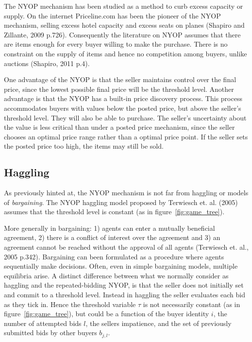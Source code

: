 \documentclass[a4paper,12pt]{article}
\begin{document}
	The NYOP mechanism has been studied as a method to curb excess capacity or supply. On the internet Priceline.com has been the pioneer of the NYOP mechanism, selling excess hotel capacity and excess seats on planes (Shapiro and Zillante, 2009 p.726). Consequently the literature on NYOP assumes that there are items enough for every buyer willing to make the purchase. There is no constraint on the supply of items and hence no competition among buyers, unlike auctions (Shapiro, 2011 p.4).

	One advantage of the NYOP is that the seller maintains control over the final price, since the lowest possible final price will be the threshold level. Another advantage is that the NYOP has a built-in price discovery process. This process accommodates buyers with values below the posted price, but above the seller's threshold level. They will also be able to purchase. The seller's uncertainty about the value is less critical than under a posted price mechanism, since the seller chooses an optimal price range rather than a optimal price point. If the seller sets the posted price too high, the items may still be sold.

	\subsection{Haggling}

	As previously hinted at, the NYOP mechanism is not far from haggling or models of {\it bargaining}. The NYOP haggling model proposed by Terwiesch et. al. (2005) assumes that the threshold level is constant (as in figure~\ref{fig:game_tree}). %

	More generally in bargaining: 1) agents can enter a mutually beneficial agreement, 2) there is a conflict of interest over the agreement and 3) an agreement cannot be reached without the approval of all agents (Terwiesch et. al., 2005 p.342). Bargaining can been formulated as a procedure where agents sequentially make decisions. Often, even in simple bargaining models, multiple equilibria arise. A distinct difference between what we normally consider as haggling and the repeated-bidding NYOP, is that the seller does not initially set and commit to a threshold level. Instead in haggling the seller evaluates each bid as they tick in. Hence the threshold variable $\tau$ is not necessarily constant (as in figure~\ref{fig:game_tree}), but could be a function of the buyer identity $i$, the number of attempted bids $l$, the sellers impatience, and the set of previously submitted bids by other buyers $b_{j,l}$.
\end{document}
